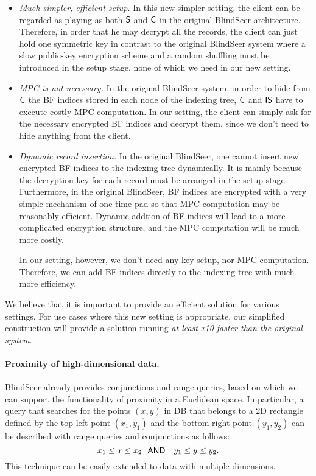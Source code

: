 \begin{itemize}
\item {\em Much simpler, efficient setup.}
In this new simpler setting, the client can be regarded as playing as both $\sf
 S$ and $\sf C$ in the original BlindSeer architecture. Therefore, in order
 that he may decrypt all the records, the client can just hold one symmetric
 key in contrast to the original BlindSeer system where a slow public-key
 encryption scheme and a random shuffling must be introduced in the setup
 stage, none of which we need in our new setting. 

\item {\em MPC is not necessary.} In the original BlindSeer system, in order to
hide from $\sf C$ the BF indices stored in each node of the indexing tree, $\sf
C$ and $\sf IS$ have to execute costly MPC computation. In our setting, the
client can simply ask for the necessary encrypted BF indices and decrypt
them, since we don't need to hide anything from the client.  


\item {\em Dynamic record insertion.} In the original BlindSeer, one cannot
insert new encrypted BF indices to the indexing tree dynamically.  It is mainly
because the decryption key for each record must be arranged in the setup
stage.
%
Furthermore, in the original BlindSeer, BF indices are encrypted with a very
    simple mechanism of one-time pad so that MPC computation may be reasonably
    efficient. Dynamic addtion of BF indices will lead to a more complicated
    encryption structure, and the MPC computation will be much more costly.

In our setting, however, we don't need any key setup, nor MPC computation.
Therefore, we can add BF indices directly to the indexing tree with much more
efficiency.  
\end{itemize}

We believe that it is important to provide an efficient solution for various
settings. For use cases where this new setting is appropriate, our simplified
construction will provide a solution running {\em at least x10 faster than the
original system}.  

\paragraph{Proximity of high-dimensional data.}
BlindSeer already provides conjunctions and range queries, based on which we
can support the functionality of proximity in a Euclidean space. 
In particular, a query that searches for the points $(x, y)$ in DB that belongs
to a 2D rectangle defined by the top-left point $(x_1, y_1)$ and the
bottom-right point $(y_1, y_2)$ can be described with range queries and
conjunctions as follows: $$ x_1 \le x \le x_2 ~~{\sf AND}~~~ y_1 \le y \le y_2.
$$ This technique can be easily extended to data with multiple dimensions. 

